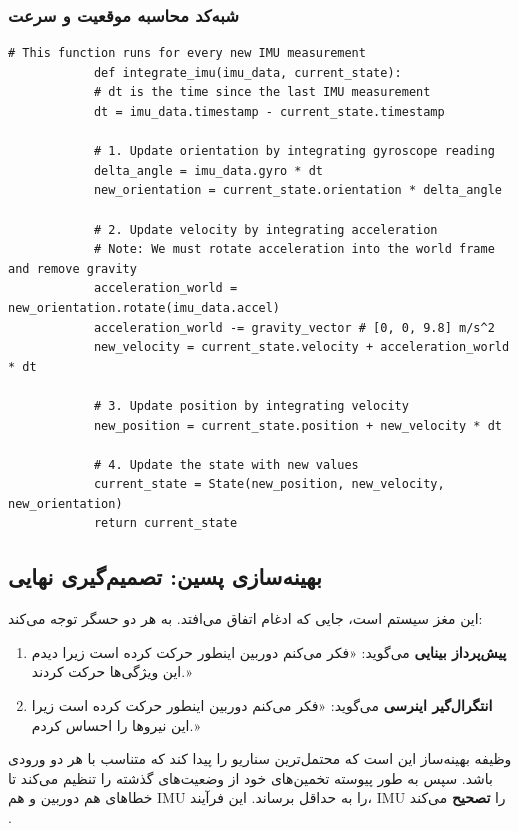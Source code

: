 \documentclass[11pt, a4paper]{article}
\begin{document}
	\subsubsection{شبه‌کد محاسبه موقعیت و سرعت}
	\begin{latin}
		\begin{lstlisting}[caption={\rl{شبه کد انتگرال‌گیری از واحد اندازه‌گیری اینرسی}}, label={lst:imupseudo}]
			# This function runs for every new IMU measurement
			def integrate_imu(imu_data, current_state):
			# dt is the time since the last IMU measurement
			dt = imu_data.timestamp - current_state.timestamp
			
			# 1. Update orientation by integrating gyroscope reading
			delta_angle = imu_data.gyro * dt
			new_orientation = current_state.orientation * delta_angle
			
			# 2. Update velocity by integrating acceleration
			# Note: We must rotate acceleration into the world frame and remove gravity
			acceleration_world = new_orientation.rotate(imu_data.accel)
			acceleration_world -= gravity_vector # [0, 0, 9.8] m/s^2
			new_velocity = current_state.velocity + acceleration_world * dt
			
			# 3. Update position by integrating velocity
			new_position = current_state.position + new_velocity * dt
			
			# 4. Update the state with new values
			current_state = State(new_position, new_velocity, new_orientation)
			return current_state
		\end{lstlisting}
	\end{latin}
	\subsection{بهینه‌سازی پسین: تصمیم‌گیری نهایی}
	این مغز سیستم است، جایی که ادغام اتفاق می‌افتد. به هر دو حسگر توجه می‌کند:
	\begin{enumerate}
		\item \textbf{پیش‌پرداز بینایی}
		می‌گوید: «فکر می‌کنم دوربین اینطور حرکت کرده است زیرا دیدم این ویژگی‌ها حرکت کردند.»
		\item \textbf{انتگرال‌گیر اینرسی}
		می‌گوید: «فکر می‌کنم دوربین اینطور حرکت کرده است زیرا این نیروها را احساس کردم.»
		
		
	\end{enumerate}
	وظیفه بهینه‌ساز این است که محتمل‌ترین سناریو را پیدا کند که متناسب  با هر دو ورودی باشد. سپس به طور پیوسته تخمین‌های خود از وضعیت‌های گذشته را تنظیم می‌کند تا خطاهای هم دوربین و هم IMU را به حداقل برساند. این فرآیند، IMU را \textbf{تصحیح} می‌کند \cite{qin2018vins}.
	
\end{document}
